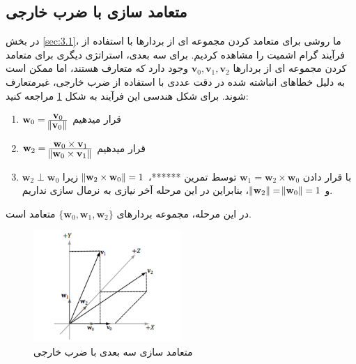 \subsection{\textbf{متعامد سازی با ضرب خارجی}}
{
    \Large
    \begin{spacing}{1.5}
        در بخش \ref{sec:3.1}، ما روشی برای متعامد کردن مجموعه ای از بردارها با استفاده از فرآیند گرام اشمیت را مشاهده کردیم.
        برای سه بعدی، استراتژی دیگری برای متعامد کردن مجموعه ای از بردارها $\textbf{v}_{0},\textbf{v}_{1},\textbf{v}_{2}$ وجود دارد که متعارف هستند،
        اما ممکن است به دلیل خطاهای انباشته شده در دقت عددی با استفاده از ضرب خارجی، غیرمتعارف شوند.
        برای شکل هندسی این فرآیند به شکل \ref{fig:4.Session.1.1.15} مراجعه کنید:

        \begin{enumerate}
            \item {$\textbf{w}_{0}=\frac{\displaystyle\textbf{v}_{0}}{\displaystyle\norm{\textbf{v}_{0}}}$ قرار میدهیم}
            \item {$\textbf{w}_{2}=\frac{\displaystyle\textbf{w}_{0}\times\textbf{v}_{1}}{\displaystyle\norm{\textbf{w}_{0}\times\textbf{v}_{1}}}$ قرار میدهیم}
            \item {با قرار دادن $\textbf{w}_{1}=\textbf{w}_{2}\times\textbf{w}_{0}$ توسط تمرین ******، $\norm{\textbf{w}_{2}\times\textbf{w}_{0}}=1$ زیرا $\textbf{w}_{2}\perp\textbf{w}_{0}$ و $\norm{\textbf{w}_{2}}=\norm{\textbf{w}_{0}}=1$،
            بنابراین در این مرحله آخر نیازی به نرمال سازی نداریم.}
        \end{enumerate}

        در این مرحله، مجموعه بردارهای $\{\textbf{w}_{0},\textbf{w}_{1},\textbf{w}_{2}\}$ متعامد است.

        \begin{figure}[H]
            \centering
            \setlength{\belowcaptionskip}{-10pt}
            \includegraphics[width=0.5\textwidth]{Images/4/4.Session.1.1.15}
            \caption {متعامد سازی سه بعدی با ضرب خارجی}
            \label{fig:4.Session.1.1.15}
        \end{figure}


\end{spacing}}
